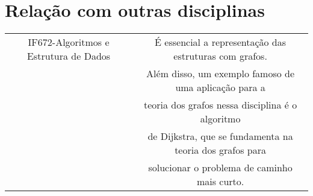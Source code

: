 \documentclass[10pt]{article}
\begin{document}
\section{Relação com outras disciplinas}

\begin{tabular}{|c|c|}
\hline
IF672-Algoritmos e Estrutura de Dados & É essencial a representação das estruturas com grafos.\\ 
& Além disso, um exemplo famoso de uma aplicação para a\\
& teoria dos grafos nessa disciplina é o algoritmo \\
& de Dijkstra, que se fundamenta na teoria dos grafos para\\
& solucionar o problema de caminho mais curto.\\ \hline
\end{tabular}


\end{document}
